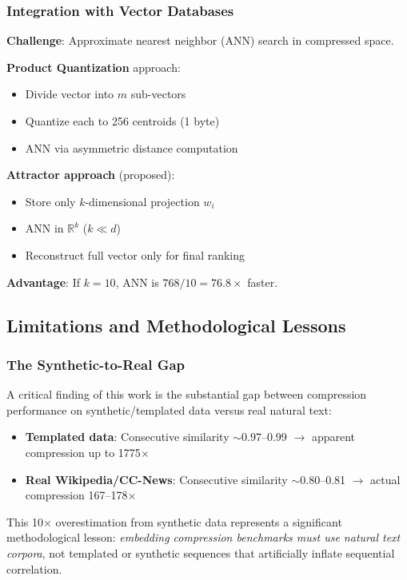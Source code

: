 \documentclass[11pt,a4paper]{article}
\begin{document}
\subsubsection{Integration with Vector Databases}

\textbf{Challenge}: Approximate nearest neighbor (ANN) search in compressed space.

\textbf{Product Quantization} \cite{jegou2011product} approach:
\begin{itemize}
\item Divide vector into $m$ sub-vectors
\item Quantize each to 256 centroids (1 byte)
\item ANN via asymmetric distance computation
\end{itemize}

\textbf{Attractor approach} (proposed):
\begin{itemize}
\item Store only $k$-dimensional projection $w_i$
\item ANN in $\mathbb{R}^k$ ($k \ll d$)
\item Reconstruct full vector only for final ranking
\end{itemize}

\textbf{Advantage}: If $k = 10$, ANN is $768/10 = 76.8\times$ faster.

\subsection{Limitations and Methodological Lessons}

\subsubsection{The Synthetic-to-Real Gap}

A critical finding of this work is the substantial gap between compression performance on synthetic/templated data versus real natural text:

\begin{itemize}
\item \textbf{Templated data}: Consecutive similarity $\sim$0.97--0.99 $\to$ apparent compression up to 1775$\times$
\item \textbf{Real Wikipedia/CC-News}: Consecutive similarity $\sim$0.80--0.81 $\to$ actual compression 167--178$\times$
\end{itemize}

This 10$\times$ overestimation from synthetic data represents a significant methodological lesson: \textit{embedding compression benchmarks must use natural text corpora}, not templated or synthetic sequences that artificially inflate sequential correlation.
\end{document}
